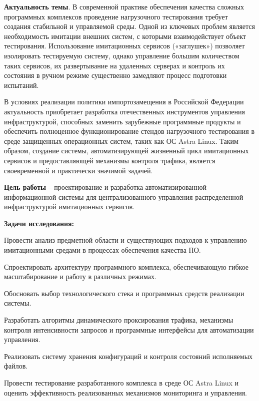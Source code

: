 \Introduction

\textbf{Актуальность темы}. В современной практике обеспечения качества сложных программных комплексов проведение нагрузочного тестирования требует создания стабильной и управляемой среды. Одной из ключевых проблем является необходимость имитации внешних систем, с которыми взаимодействует объект тестирования. Использование имитационных сервисов («заглушек») позволяет изолировать тестируемую систему, однако управление большим количеством таких сервисов, их развертывание на удаленных серверах и контроль их состояния в ручном режиме существенно замедляют процесс подготовки испытаний.

В условиях реализации политики импортозамещения в Российской Федерации актуальность приобретает разработка отечественных инструментов управления инфраструктурой, способных заменить зарубежные программные продукты и обеспечить полноценное функционирование стендов нагрузочного тестирования в среде защищенных операционных систем, таких как ОС Astra Linux. Таким образом, создание системы, автоматизирующей жизненный цикл имитационных сервисов и предоставляющей механизмы контроля трафика, является своевременной и практически значимой задачей.

\textbf{Цель работы} -- проектирование и разработка автоматизированной информационной системы для централизованного управления распределенной инфраструктурой имитационных сервисов.

\textbf{Задачи исследования:}
\begin{compactlist}
  \item Провести анализ предметной области и существующих подходов к управлению имитационными средами в процессах обеспечения качества ПО.
  \item Спроектировать архитектуру программного комплекса, обеспечивающую гибкое масштабирование и работу в различных режимах.
  \item Обосновать выбор технологического стека и программных средств реализации системы.
  \item Разработать алгоритмы динамического проксирования трафика, механизмы контроля интенсивности запросов и программные интерфейсы для автоматизации управления.
  \item Реализовать систему хранения конфигураций и контроля состояний исполняемых файлов.
  \item Провести тестирование разработанного комплекса в среде ОС Astra Linux и оценить эффективность реализованных механизмов мониторинга и управления.
\end{compactlist}

